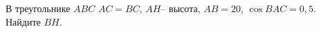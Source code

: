 \begin{ex}
	\begin{condition}
		В треугольнике \(ABC\) \( AC=BC \), \( AH – \) высота, \( AB=20 \),  \( \cos BAC=0,5 \). Найдите \( BH \).
	\end{condition}
\end{ex}